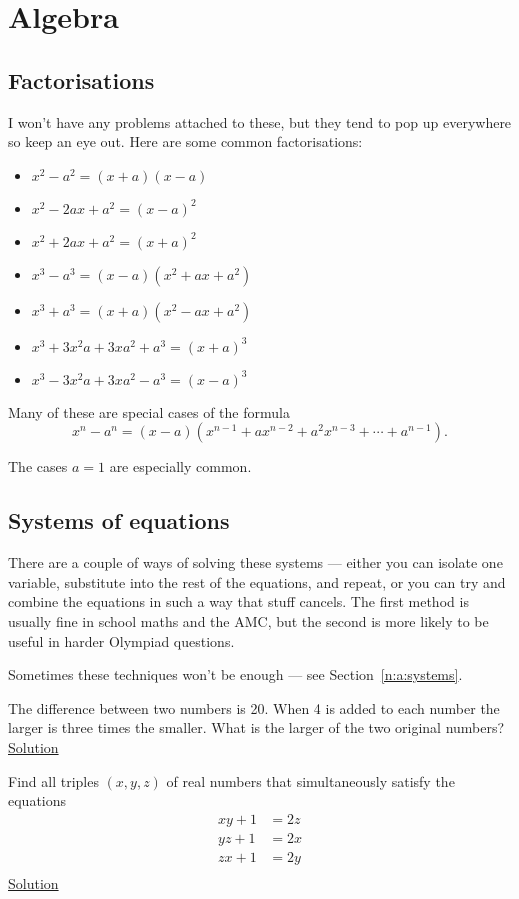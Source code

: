 \section{Algebra}
\subsection{Factorisations}\label{b:a:factor}
I won't have any problems attached to these, but they tend to pop up everywhere
so keep an eye out. Here are some common factorisations:
\begin{itemize}
  \item $x^2-a^2=(x+a)(x-a)$
  \item $x^2-2ax+a^2=(x-a)^2$
  \item $x^2+2ax+a^2=(x+a)^2$
  \item $x^3-a^3=(x-a)(x^2+ax+a^2)$
  \item $x^3+a^3=(x+a)(x^2-ax+a^2)$
  \item $x^3+3x^2a+3xa^2+a^3=(x+a)^3$
  \item $x^3-3x^2a+3xa^2-a^3=(x-a)^3$
\end{itemize}
Many of these are special cases of the formula
\[x^n-a^n=(x-a)(x^{n-1}+ax^{n-2}+a^2x^{n-3}+\cdots+a^{n-1}).\]

The cases $a=1$ are especially common.
\subsection{Systems of equations}
There are a couple of ways of solving these systems --- either you can
isolate one variable, substitute into the rest of the equations, and repeat, or
you can try and combine the equations in such a way that stuff cancels. The
first method is usually fine in school maths and the AMC, but the second is more
likely to be useful in harder Olympiad questions.

Sometimes these techniques won't be enough --- see Section~\ref{n:a:systems}.
\begin{problem}\label{p:b:a:systems:1}
  The difference between two numbers is 20. When 4 is added to each number the
  larger is three times the smaller. What is the larger of the two original
  numbers?
  \hyperlink{s:b:a:systems:1}{Solution}
\end{problem}
\begin{problem}\label{p:b:a:systems:2}
  Find all triples $(x,y,z)$ of real numbers that simultaneously satisfy the
  equations
  \begin{align*}
    xy+1&=2z \\
    yz+1&=2x \\
    zx+1&=2y \\
  \end{align*}
  \hyperlink{s:b:a:systems:2}{Solution}
\end{problem}
